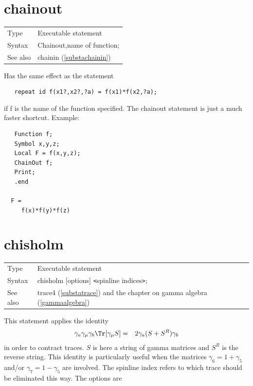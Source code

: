  
\section{chainout}
\label{substachainout}

\noindent \begin{tabular}{ll}
Type & Executable statement\\
Syntax & Chainout,name of function;
\\ See also & chainin (\ref{substachainin})
\end{tabular} \vspace{4mm}

\noindent Has the same effect as the statement
\begin{verbatim}
   repeat id f(x1?,x2?,?a) = f(x1)*f(x2,?a);
\end{verbatim}
if f is the name of the function specified. The chainout statement is just a 
much faster shortcut. Example:
\begin{verbatim}
   Function f;
   Symbol x,y,z;
   Local F = f(x,y,z);
   ChainOut f;
   Print;
   .end

  F =
     f(x)*f(y)*f(z)
\end{verbatim}
\vspace{10mm}


\section{chisholm}
\label{substachisholm}

\noindent \begin{tabular}{ll}
Type & Executable statement\\
Syntax & chisholm [options] {\tt<}spinline indices{\tt>}; \\
See also & trace4 (\ref{substatrace}) and the chapter on gamma algebra 
(\ref{gammaalgebra})
\end{tabular} \vspace{4mm}

\noindent This statement applies the identity
\begin{eqnarray}
    \gamma_a\gamma_\mu\gamma_b \Tr[\gamma_\mu S] & = &
         2\gamma_a( S + S^R ) \gamma_b  \nonumber
\end{eqnarray}
in order to contract traces. $S$ is here a string of
gamma matrices and $S^R$ is the reverse string. This 
identity is particularly useful when the matrices $\gamma_6 = 1+\gamma_5$ 
and/or $\gamma_7 = 1-\gamma_5$ are involved. The spinline index refers to 
which trace should be eliminated this way. The options are \vspace{1mm}
 
